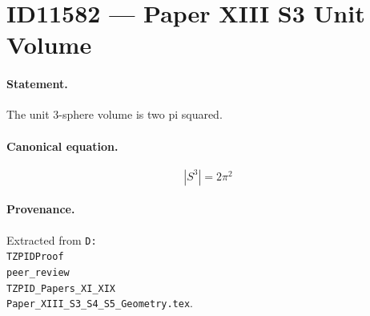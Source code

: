 \section*{ID11582 --- Paper XIII S3 Unit Volume}

\paragraph{Statement.}
The unit 3-sphere volume is two pi squared.

\paragraph{Canonical equation.}
\[
|S^3|=2\pi^2
\]

\paragraph{Provenance.}
Extracted from \texttt{D:\\TZPIDProof\\peer\_review\\TZPID\_Papers\_XI\_XIX\\Paper\_XIII\_S3\_S4\_S5\_Geometry.tex}.
